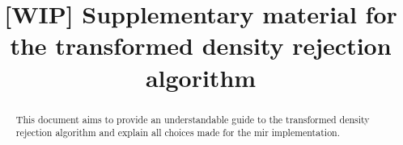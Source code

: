 \documentclass[]{article}
\title{[WIP] Supplementary material for the transformed density rejection algorithm}
\author{}
\begin{document}
\maketitle

\begin{abstract}
This document aims to provide an understandable guide to the transformed density rejection algorithm and explain all choices made for the mir implementation.
\end{abstract}





\end{document}
